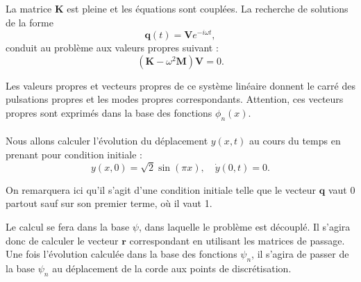 \documentclass[a4paper,11pt]{article}
\begin{document}
	La matrice $\mathbf{K}$ est pleine et les équations sont couplées. La recherche de solutions de la forme
	\[
	\mathbf{q}(t) = \mathbf{V} e^{-i\omega t},
	\]
	conduit au problème aux valeurs propres suivant :
	\[
	\left(\mathbf{K} - \omega^2 \mathbf{M}\right)\mathbf{V} = 0.
	\tag{3}
	\]
	
	Les valeurs propres et vecteurs propres de ce système linéaire donnent le carré des pulsations propres et les modes propres correspondants. Attention, ces vecteurs propres sont exprimés dans la base des fonctions $\phi_n(x)$.
	\\ \\
	Nous allons calculer l’évolution du déplacement \(y(x,t)\) au cours du temps en prenant pour condition initiale :
	\[
	y(x, 0) = \sqrt{2}\sin(\pi x), \quad \dot{y}(0, t) = 0.
	\]
	
	On remarquera ici qu’il s’agit d’une condition initiale telle que le vecteur \(\mathbf{q}\) vaut 0 partout sauf sur son premier terme, où il vaut 1. 
	
	Le calcul se fera dans la base \(\psi\), dans laquelle le problème est découplé. Il s’agira donc de calculer le vecteur \(\mathbf{r}\) correspondant en utilisant les matrices de passage. Une fois l’évolution calculée dans la base des fonctions \(\psi_n\), il s’agira de passer de la base \(\psi_n\) au déplacement de la corde aux points de discrétisation.
	
\end{document}
